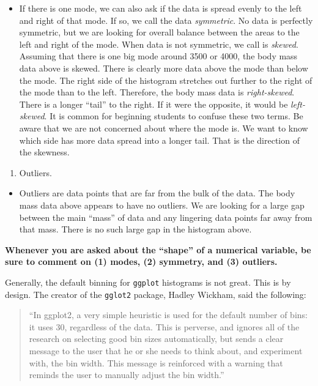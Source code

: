 \documentclass[
]{book}
\providecommand{\tightlist}{%
  \setlength{\itemsep}{0pt}\setlength{\parskip}{0pt}}
\begin{document}
\begin{itemize}
\tightlist
\item
  If there is one mode, we can also ask if the data is spread evenly to the left and right of that mode. If so, we call the data \emph{symmetric}. No data is perfectly symmetric, but we are looking for overall balance between the areas to the left and right of the mode. When data is not symmetric, we call is \emph{skewed}. Assuming that there is one big mode around 3500 or 4000, the body mass data above is skewed. There is clearly more data above the mode than below the mode. The right side of the histogram stretches out further to the right of the mode than to the left. Therefore, the body mass data is \emph{right-skewed}. There is a longer ``tail'' to the right. If it were the opposite, it would be \emph{left-skewed}. It is common for beginning students to confuse these two terms. Be aware that we are not concerned about where the mode is. We want to know which side has more data spread into a longer tail. That is the direction of the skewness.
\end{itemize}

\begin{enumerate}
\def\labelenumi{\arabic{enumi}.}
\setcounter{enumi}{2}
\tightlist
\item
  Outliers.
\end{enumerate}

\begin{itemize}
\tightlist
\item
  Outliers are data points that are far from the bulk of the data. The body mass data above appears to have no outliers. We are looking for a large gap between the main ``mass'' of data and any lingering data points far away from that mass. There is no such large gap in the histogram above.
\end{itemize}

\textbf{Whenever you are asked about the ``shape'' of a numerical variable, be sure to comment on (1) modes, (2) symmetry, and (3) outliers.}

Generally, the default binning for \texttt{ggplot} histograms is not great. This is by design. The creator of the \texttt{gglot2} package, Hadley Wickham, said the following:

\begin{quote}
``In ggplot2, a very simple heuristic is used for the default number of bins: it uses 30, regardless of the data. This is perverse, and ignores all of the research on selecting good bin sizes automatically, but sends a clear message to the user that he or she needs to think about, and experiment with, the bin width. This message is reinforced with a warning that reminds the user to manually adjust the bin width.''
\end{quote}
\end{document}
